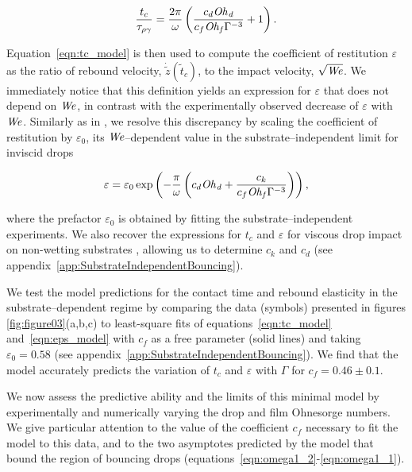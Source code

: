 \begin{align}
	\frac{t_{c}}{\tau_{\rho\gamma}} =  \dfrac{2 \pi}{\omega} \left( \dfrac{c_{d} \mathit{Oh}_\mathit{d}}{c_{f} \mathit{Oh}_\mathit{f}\Gamma^{-3}} + 1 \right). \label{eqn:tc_model}
\end{align}

\noindent Equation~\eqref{eqn:tc_model} is then used to compute the coefficient of restitution $\varepsilon$ as the ratio of rebound velocity, $\dot{\tilde{z}}(\tilde{t}_c)$, to the impact velocity, $\sqrt{\mathit{We}}$. We immediately notice that this definition yields an expression for $\varepsilon$ that does not depend on $\mathit{We}$, in contrast with the experimentally observed decrease of $\varepsilon$ with $\mathit{We}$. Similarly as in \citet{jha2020viscous}, we resolve this discrepancy by scaling the coefficient of restitution by $\varepsilon_0$, its $\mathit{We}$--dependent value in the substrate--independent limit for inviscid drops

\begin{align}
	\varepsilon  = \varepsilon_0 \exp\left( -\dfrac{\pi}{\omega} \left( c_{d} \mathit{Oh}_\mathit{d} + \dfrac{c_{k}}{c_{f} \mathit{Oh}_\mathit{f} \Gamma^{-3}} \right) \right),
	\label{eqn:eps_model}
\end{align}

\noindent where the prefactor $\varepsilon_0$ is obtained by fitting the substrate--independent experiments. We also recover the expressions for $t_c$ and $\varepsilon$ for viscous drop impact on non-wetting substrates \citep{jha2020viscous}, allowing us to determine $c_k$ and $c_d$ (see appendix~\ref{app:SubstrateIndependentBouncing}).

We test the model predictions for the contact time and rebound elasticity in the substrate--dependent regime by comparing the data (symbols) presented in figures \ref{fig:figure03}(a,b,c) to least-square fits of equations~\eqref{eqn:tc_model} and~\eqref{eqn:eps_model} with $c_f$ as a free parameter (solid lines) and taking $\varepsilon_0 = 0.58$ (see appendix~\ref{app:SubstrateIndependentBouncing}). We find that the model accurately predicts the variation of $t_c$ and $\varepsilon$ with $\Gamma$ for $c_f = 0.46 \pm 0.1$.

We now assess the predictive ability and the limits of this minimal model by experimentally and numerically varying the drop and film Ohnesorge numbers. We give particular attention to the value of the coefficient $c_f$ necessary to fit the model to this data, and to the two asymptotes predicted by the model that bound the region of bouncing drops (equations~\eqref{eqn:omega1_2}-\eqref{eqn:omega1_1}).

